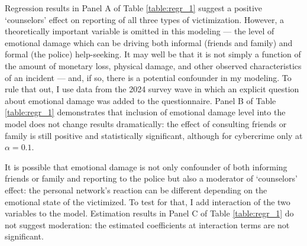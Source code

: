 \documentclass[]{interact}
\theoremstyle{plain}%
\theoremstyle{definition}
\theoremstyle{remark}
\begin{document}
	Regression results in Panel A of Table \ref{table:regr_1} suggest a positive `counselors' effect on reporting of all three types of victimization. However, a theoretically important variable is omitted in this modeling --- the level of emotional damage which can be driving both informal (friends and family) and formal (the police) help-seeking. It may well be that it is not simply a function of the amount of monetary loss, physical damage, and other observed characteristics of an incident --- and, if so, there is a potential confounder in my modeling. To rule that out, I use data from the 2024 survey wave in which an explicit question about emotional damage was added to the questionnaire. Panel B of Table \ref{table:regr_1} demonstrates that inclusion of emotional damage level into the model does not change results dramatically: the effect of consulting friends or family is still positive and statistically significant, although for cybercrime only at $\alpha = 0.1$. 
	
	It is possible that emotional damage is not only confounder of both informing friends or family and reporting to the police but also a moderator of `counselors' effect: the personal network's reaction can be different depending on the emotional state of the victimized. To test for that, I add interaction of the two variables to the model. Estimation results in Panel C of Table \ref{table:regr_1} do not suggest moderation: the estimated coefficients at interaction terms are not significant.
	
\end{document}
